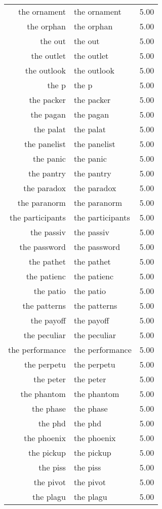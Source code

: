 \begin{table}[ht]
\begin{tabular}{rlr}
  the ornament & the ornament & 5.00 \\ 
  the orphan & the orphan & 5.00 \\ 
  the out & the out & 5.00 \\ 
  the outlet & the outlet & 5.00 \\ 
  the outlook & the outlook & 5.00 \\ 
  the p & the p & 5.00 \\ 
  the packer & the packer & 5.00 \\ 
  the pagan & the pagan & 5.00 \\ 
  the palat & the palat & 5.00 \\ 
  the panelist & the panelist & 5.00 \\ 
  the panic & the panic & 5.00 \\ 
  the pantry & the pantry & 5.00 \\ 
  the paradox & the paradox & 5.00 \\ 
  the paranorm & the paranorm & 5.00 \\ 
  the participants & the participants & 5.00 \\ 
  the passiv & the passiv & 5.00 \\ 
  the password & the password & 5.00 \\ 
  the pathet & the pathet & 5.00 \\ 
  the patienc & the patienc & 5.00 \\ 
  the patio & the patio & 5.00 \\ 
  the patterns & the patterns & 5.00 \\ 
  the payoff & the payoff & 5.00 \\ 
  the peculiar & the peculiar & 5.00 \\ 
  the performance & the performance & 5.00 \\ 
  the perpetu & the perpetu & 5.00 \\ 
  the peter & the peter & 5.00 \\ 
  the phantom & the phantom & 5.00 \\ 
  the phase & the phase & 5.00 \\ 
  the phd & the phd & 5.00 \\ 
  the phoenix & the phoenix & 5.00 \\ 
  the pickup & the pickup & 5.00 \\ 
  the piss & the piss & 5.00 \\ 
  the pivot & the pivot & 5.00 \\ 
  the plagu & the plagu & 5.00 \\ 

\end{tabular}
\end{table}
